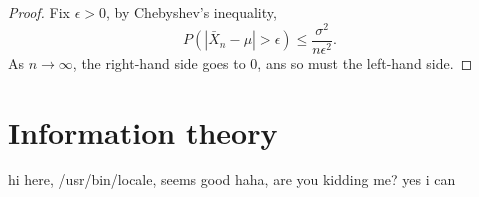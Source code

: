 \documentclass{./utils/mydoc}
\numberwithin{equation}{section} %
\theoremstyle{definition}
\theoremstyle{remark}
\begin{document}
\begin{proof}
  Fix $\epsilon >0$, by Chebyshev's inequality,
  \[
  P(|\bar{X}_n-\mu|>\epsilon) \le \frac{\sigma^2}{n\epsilon^2}.
  \]
  As $n\to\infty$, the right-hand side goes to 0, ans so must the left-hand side.
\end{proof}

\section{Information theory}

hi here, /usr/bin/locale, seems good haha, are you kidding me? yes i can



\end{document}
